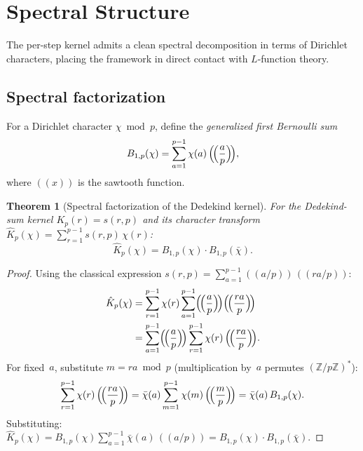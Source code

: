 \documentclass[11pt]{article}
\newtheorem{theorem}{Theorem}[section]
\theoremstyle{definition}
\newcommand{\Z}{\mathbb{Z}}
\begin{document}
\section{Spectral Structure}\label{sec:spectral}

The per-step kernel admits a clean spectral decomposition in terms of
Dirichlet characters, placing the framework in direct contact with
$L$-function theory.

\subsection{Spectral factorization}\label{sec:spectral-factor}

For a Dirichlet character $\chi \bmod p$, define the
\emph{generalized first Bernoulli sum}
\begin{equation}\label{eq:bernoulli-sum}
  B_{1,p}(\chi) = \sum_{a=1}^{p-1} \chi(a)\,
    \Bigl(\!\Bigl(\frac{a}{p}\Bigr)\!\Bigr),
\end{equation}
where $((x))$ is the sawtooth function.

\begin{theorem}[Spectral factorization of the Dedekind kernel]
\label{thm:spectral}
For the Dedekind-sum kernel $K_p(r) = s(r,p)$ and its character
transform
$\hat{K}_p(\chi) = \sum_{r=1}^{p-1} s(r,p)\,\chi(r)$:
\begin{equation}\label{eq:spectral-factor}
  \hat{K}_p(\chi) = B_{1,p}(\chi) \cdot B_{1,p}(\bar{\chi}).
\end{equation}
\end{theorem}

\begin{proof}
Using the classical expression
$s(r,p) = \sum_{a=1}^{p-1} ((a/p))\,((ra/p))$:
\begin{align*}
  \hat{K}_p(\chi) &= \sum_{r=1}^{p-1} \chi(r)
    \sum_{a=1}^{p-1} \Bigl(\!\Bigl(\frac{a}{p}\Bigr)\!\Bigr)
    \Bigl(\!\Bigl(\frac{ra}{p}\Bigr)\!\Bigr) \\
  &= \sum_{a=1}^{p-1} \Bigl(\!\Bigl(\frac{a}{p}\Bigr)\!\Bigr)
    \sum_{r=1}^{p-1} \chi(r)\,
    \Bigl(\!\Bigl(\frac{ra}{p}\Bigr)\!\Bigr).
\end{align*}
For fixed~$a$, substitute $m = ra \bmod p$ (multiplication by~$a$
permutes $(\Z/p\Z)^*$):
\[
  \sum_{r=1}^{p-1} \chi(r)\,\Bigl(\!\Bigl(\frac{ra}{p}\Bigr)\!\Bigr)
  = \bar{\chi}(a) \sum_{m=1}^{p-1} \chi(m)\,
    \Bigl(\!\Bigl(\frac{m}{p}\Bigr)\!\Bigr)
  = \bar{\chi}(a)\, B_{1,p}(\chi).
\]
Substituting:
$\hat{K}_p(\chi) = B_{1,p}(\chi) \sum_{a=1}^{p-1} \bar{\chi}(a)\,
((a/p)) = B_{1,p}(\chi) \cdot B_{1,p}(\bar{\chi})$.
\end{proof}
\end{document}
